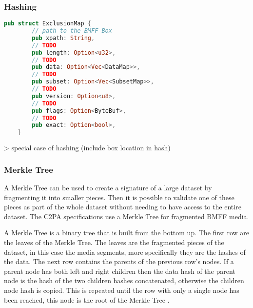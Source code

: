 \subsubsection{Hashing}


\begin{minipage}{\linewidth}
\begin{lstlisting}[caption={ExclusionMap Rust Definition}, label=code:exclusion_map, language=Rust, captionpos=b]
    pub struct ExclusionMap {
        // path to the BMFF Box
        pub xpath: String,
        // TODO
        pub length: Option<u32>,
        // TODO
        pub data: Option<Vec<DataMap>>,
        // TODO
        pub subset: Option<Vec<SubsetMap>>,
        // TODO
        pub version: Option<u8>,
        // TODO
        pub flags: Option<ByteBuf>,
        // TODO
        pub exact: Option<bool>,
    }
\end{lstlisting}
\end{minipage}

> special case of hashing (include box location in hash)

\subsubsection{Merkle Tree\label{sec:merkle}}

A Merkle Tree can be used to create a signature of a large dataset by fragmenting it into smaller pieces. Then it is possible to validate one of these pieces as part of the whole dataset without needing to have access to the entire dataset. The C2PA specifications use a Merkle Tree for fragmented BMFF media.

A Merkle Tree is a binary tree that is built from the bottom up. The first row are the leaves of the Merkle Tree. The leaves are the fragmented pieces of the dataset, in this case the media segments, more specifically they are the hashes of the data. The next row contains the parents of the previous row's nodes. If a parent node has both left and right children then the data hash of the parent node is the hash of the two children hashes concatenated, otherwise the children node hash is copied. This is repeated until the row with only a single node has been reached, this node is the root of the Merkle Tree \cite{merkle}.


